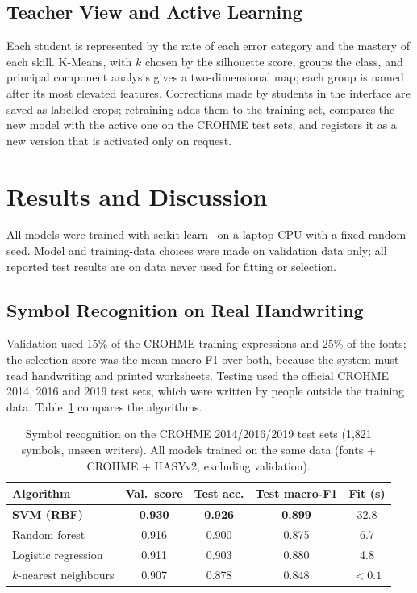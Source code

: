 \documentclass[runningheads]{llncs}
\begin{document}
\subsection{Teacher View and Active Learning}

Each student is represented by the rate of each error category and the mastery of each skill. K-Means, with $k$ chosen by the silhouette score, groups the class, and principal component analysis gives a two-dimensional map; each group is named after its most elevated features. Corrections made by students in the interface are saved as labelled crops; retraining adds them to the training set, compares the new model with the active one on the CROHME test sets, and registers it as a new version that is activated only on request.

\section{Results and Discussion}

All models were trained with scikit-learn~\cite{pedregosa2011} on a laptop CPU with a fixed random seed. Model and training-data choices were made on validation data only; all reported test results are on data never used for fitting or selection.

\subsection{Symbol Recognition on Real Handwriting}\label{sec:res-ocr}

Validation used 15\% of the CROHME training expressions and 25\% of the fonts; the selection score was the mean macro-F1 over both, because the system must read handwriting and printed worksheets. Testing used the official CROHME 2014, 2016 and 2019 test sets, which were written by people outside the training data. Table~\ref{tab:ocr} compares the algorithms.

\begin{table}[t]
\caption{Symbol recognition on the CROHME 2014/2016/2019 test sets (1,821 symbols, unseen writers). All models trained on the same data (fonts + CROHME + HASYv2, excluding validation).}\label{tab:ocr}
\centering\small
\begin{tabular}{@{}lcccc@{}}
\toprule
Algorithm & Val.\ score & Test acc. & Test macro-F1 & Fit (s) \\
\midrule
\textbf{SVM (RBF)} & \textbf{0.930} & \textbf{0.926} & \textbf{0.899} & 32.8 \\
Random forest & 0.916 & 0.900 & 0.875 & 6.7 \\
Logistic regression & 0.911 & 0.903 & 0.880 & 4.8 \\
$k$-nearest neighbours & 0.907 & 0.878 & 0.848 & $<0.1$ \\
\bottomrule
\end{tabular}
\end{table}
\end{document}

